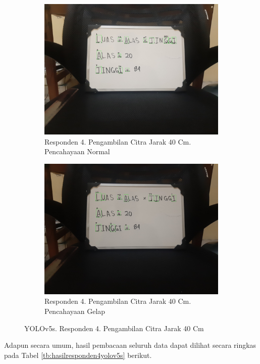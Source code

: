 \begin{figure}[H]
  \begin{subfigure}{.5\textwidth}
    \centering
    \captionsetup{width=.8\linewidth}
    \includegraphics[width=.8\linewidth]{gambar/yolov5s/responden4/hakimaxt40cm00-result.jpg}
    \caption{Responden 4. Pengambilan Citra Jarak 40 Cm. Pencahayaan Normal}
    \label{fig:sr4tcitra40cm}
  \end{subfigure}%
  \begin{subfigure}{.5\textwidth}
    \centering
    \captionsetup{width=.8\linewidth}
    \includegraphics[width=.8\linewidth]{gambar/yolov5s/responden4/hakimaxt40cm10-result.jpg}
    \caption{Responden 4. Pengambilan Citra Jarak 40 Cm. Pencahayaan Gelap}
    \label{fig:sr4gcitra40cm}
  \end{subfigure}
  \caption{YOLOv5s. Responden 4. Pengambilan Citra Jarak 40 Cm}
  \label{fig:sr4citra40cm}
\end{figure}


Adapun secara umum, hasil pembacaan seluruh data dapat dilihat secara ringkas pada Tabel \ref*{tb:hasilresponden4yolov5s} berikut.

